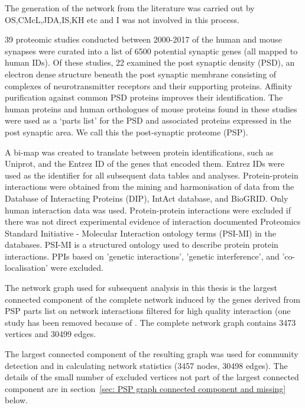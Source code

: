 The generation of the network from the literature was carried out by OS,CMcL,JDA,IS,KH etc and I was not involved in this process.

39 proteomic studies conducted between 2000-2017 of the human and mouse synapses were curated into a list of 6500 potential synaptic genes (all mapped to human IDs). \cite{heil2018systems}  Of these studies, 22 examined the post synaptic density (PSD), an electron dense structure beneath the post synaptic membrane \cite{PALAY1956}  consisting of complexes of neurotransmitter receptors and their supporting proteins. \cite{kennedy2000signal}  Affinity purification against common PSD proteins improves their identification. \cite{ewing2007large}  The human proteins and human orthologues of mouse proteins found in these studies were used as a ‘parts list’ for the PSD and associated proteins expressed in the post synaptic area. We call this the post-synaptic proteome (PSP).

  A bi-map was created to translate between protein identifications, such as Uniprot\cite{uniprot2017uniprot}, and the Entrez ID of the genes that encoded them. Entrez IDs were used as the identifier for all subsequent data tables and analyses. Protein-protein interactions were obtained from the mining and harmonisation of data from the Database of Interacting Proteins (DIP), \cite{xenarios2002dip}  IntAct database, \cite{orchard2014mintact}  and BioGRID. \cite{chatr2017biogrid}  Only human interaction data was used. Protein-protein interactions were excluded if there was not direct experimental evidence of interaction documented  Proteomics Standard Initiative - Molecular Interaction ontology terms (PSI-MI) in the databases. PSI-MI is a structured ontology used to describe protein protein interactions.\cite{isserlin2011biomolecular} PPIs based on 'genetic interactions', 'genetic interference', and 'co-localisation' were excluded.

 The network graph used for subsequent analysis in this thesis is the largest connected component of the complete network induced by the genes derived from PSP parts list on network interactions filtered for high quality interaction (one study has been removed because of . The complete network graph contains 3473 vertices and 30499 edges. 
 
The largest connected component of the resulting graph was used for community detection and in calculating network statistics (3457 nodes, 30498 edges). The details of the small number of excluded vertices not part of the largest connected component are in section~\ref{sec: PSP graph connected component and missing} below.

